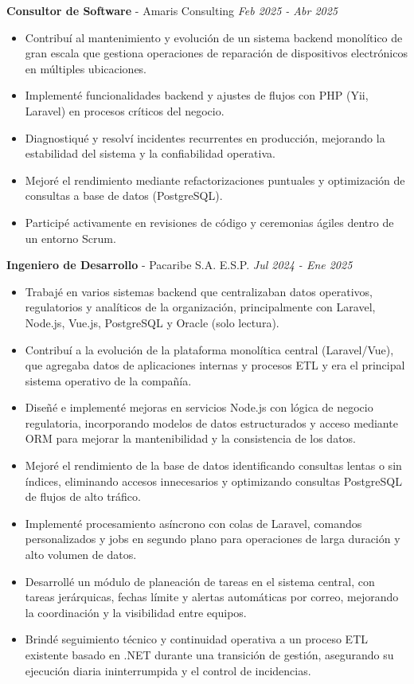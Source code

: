 \documentclass[9pt,letterpaper]{extarticle}
\begin{document}
	\textbf{Consultor de Software} - {Amaris Consulting}
	\hfill \textit{Feb 2025 - Abr 2025}
	\begin{itemize}
		\item Contribuí al mantenimiento y evolución de un sistema backend monolítico de gran escala que gestiona operaciones de reparación de dispositivos electrónicos en múltiples ubicaciones.
		\item Implementé funcionalidades backend y ajustes de flujos con PHP (Yii, Laravel) en procesos críticos del negocio.
		\item Diagnostiqué y resolví incidentes recurrentes en producción, mejorando la estabilidad del sistema y la confiabilidad operativa.
		\item Mejoré el rendimiento mediante refactorizaciones puntuales y optimización de consultas a base de datos (PostgreSQL).
		\item Participé activamente en revisiones de código y ceremonias ágiles dentro de un entorno Scrum.
	\end{itemize}
	
	\textbf{Ingeniero de Desarrollo} - {Pacaribe S.A. E.S.P.}
	\hfill \textit{Jul 2024 - Ene 2025}
	\begin{itemize}
		\item Trabajé en varios sistemas backend que centralizaban datos operativos, regulatorios y analíticos de la organización, principalmente con Laravel, Node.js, Vue.js, PostgreSQL y Oracle (solo lectura).
		\item Contribuí a la evolución de la plataforma monolítica central (Laravel/Vue), que agregaba datos de aplicaciones internas y procesos ETL y era el principal sistema operativo de la compañía.
		\item Diseñé e implementé mejoras en servicios Node.js con lógica de negocio regulatoria, incorporando modelos de datos estructurados y acceso mediante ORM para mejorar la mantenibilidad y la consistencia de los datos.
		\item Mejoré el rendimiento de la base de datos identificando consultas lentas o sin índices, eliminando accesos innecesarios y optimizando consultas PostgreSQL de flujos de alto tráfico.
		\item Implementé procesamiento asíncrono con colas de Laravel, comandos personalizados y jobs en segundo plano para operaciones de larga duración y alto volumen de datos.
		\item Desarrollé un módulo de planeación de tareas en el sistema central, con tareas jerárquicas, fechas límite y alertas automáticas por correo, mejorando la coordinación y la visibilidad entre equipos.
		\item Brindé seguimiento técnico y continuidad operativa a un proceso ETL existente basado en .NET durante una transición de gestión, asegurando su ejecución diaria ininterrumpida y el control de incidencias.
	\end{itemize}
	
\end{document}

